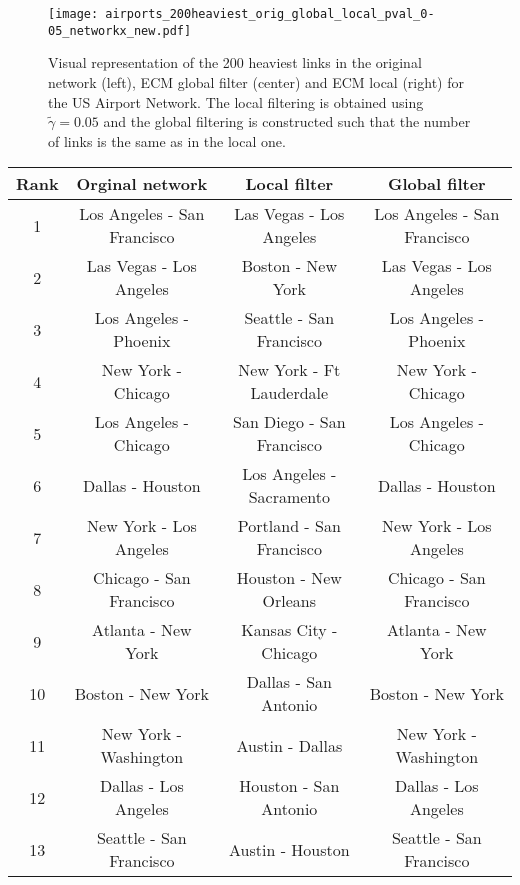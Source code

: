 \documentclass[aps,twocolumn,superscriptaddress]{revtex4-1}
\begin{document}
%
\begin{figure*}[t]
\centering
%
\texttt{[image: airports\_200heaviest\_orig\_global\_local\_pval\_0-05\_networkx\_new.pdf]}
%
\caption{Visual representation of the 200 heaviest links in the original network (left), ECM global filter (center) and ECM local (right) for the US Airport Network. The local filtering is obtained using $\widetilde{\gamma} = 0.05$ and the global filtering is constructed such that the number of links is the same as in the local one.}
\label{fig:maps_local_global_heaviest_usair}
\end{figure*}
%

%
\begin{table*}[t]
\begin{center}
 \begin{tabular}{||c | c | c | c||} 
 \hline
 Rank & Orginal network & Local filter & Global filter \\ [0.5ex] 
 \hline\hline
 1 & Los Angeles - San Francisco & Las Vegas - Los Angeles & Los Angeles - San Francisco \\ 
 \hline
 2 & Las Vegas - Los Angeles & Boston - New York & Las Vegas - Los Angeles \\
 \hline
 3 & Los Angeles - Phoenix & Seattle - San Francisco & Los Angeles - Phoenix \\
 \hline
 4 & New York - Chicago & New York - Ft Lauderdale & New York - Chicago \\
 \hline
 5 & Los Angeles - Chicago & San Diego - San Francisco & Los Angeles - Chicago \\  
 \hline
 6 & Dallas - Houston & Los Angeles - Sacramento & Dallas - Houston \\ 
 \hline
 7 & New York - Los Angeles & Portland - San Francisco & New York - Los Angeles \\
 \hline
 8 & Chicago - San Francisco & Houston - New Orleans & Chicago - San Francisco \\
 \hline
 9 & Atlanta - New York & Kansas City - Chicago & Atlanta - New York \\
 \hline
 10 & Boston - New York & Dallas - San Antonio & Boston - New York \\ 
 \hline
 11 & New York - Washington & Austin - Dallas & New York - Washington \\
 \hline
 12 & Dallas - Los Angeles & Houston - San Antonio & Dallas - Los Angeles \\
 \hline
 13 & Seattle - San Francisco & Austin - Houston & Seattle - San Francisco \\

\end{tabular}
\end{center}
\end{table*}
\end{document}
